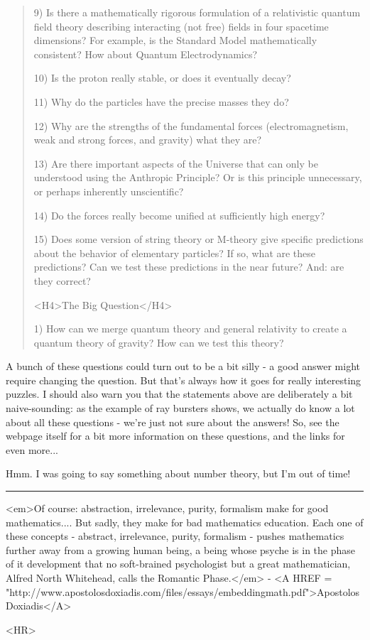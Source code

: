 \begin{quote}
 9) Is there a mathematically rigorous formulation of a relativistic 
    quantum field theory describing interacting (not free) fields in 
    four spacetime dimensions?  For example, is the Standard Model 
    mathematically consistent?  How about Quantum Electrodynamics?

 10) Is the proton really stable, or does it eventually decay?

 11) Why do the particles have the precise masses they do?
 
 12) Why are the strengths of the fundamental forces (electromagnetism, 
     weak and strong forces, and gravity) what they are?

 13) Are there important aspects of the Universe that can only be 
     understood using the Anthropic Principle?  Or is this principle 
     unnecessary, or perhaps inherently unscientific?

 14) Do the forces really become unified at sufficiently high energy?

 15) Does some version of string theory or M-theory give specific
     predictions about the behavior of elementary particles?   If 
     so, what are these predictions?  Can we test these predictions 
     in the near future?  And: are they correct?

 <H4>The Big Question</H4>

 1) How can we merge quantum theory and general relativity to create 
    a quantum theory of gravity?  How can we test this theory?

\end{quote}
    

A bunch of these questions could turn out to be a bit silly - a good
answer might require changing the question.  But that's always how it
goes for really interesting puzzles.  I should also warn you that the
statements above are deliberately a bit naive-sounding: as the example 
of \gamma  ray bursters shows, we actually do know a lot about all these 
questions - we're just not sure about the answers!  So, see the webpage 
itself for a bit more information on these questions, and the links for 
even more...

Hmm.  I was going to say something about number theory, but I'm out of 
time!

\par\noindent\rule{\textwidth}{0.4pt}
<em>Of course: abstraction, irrelevance, purity, formalism make for 
good mathematics....  But sadly, they make for bad mathematics education.
Each one of these concepts - abstract, irrelevance, purity, formalism -
pushes mathematics further away from a growing human being, a being
whose psyche is in the phase of it development that no soft-brained
psychologist but a great mathematician, Alfred North Whitehead, calls
the Romantic Phase.</em> - <A HREF = "http://www.apostolosdoxiadis.com/files/essays/embeddingmath.pdf">Apostolos Doxiadis</A>

<HR>



